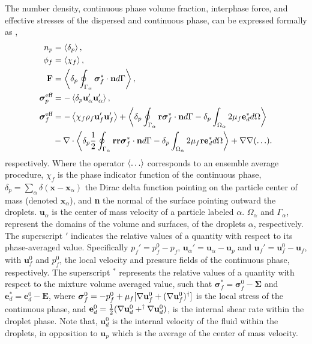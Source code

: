 The number density, continuous phase volume fraction, interphase force, and effective stresses of the dispersed and continuous phase, can be expressed formally as \citep{fintzi2025averaged},
\begin{align}
    n_p &= \pavg{}
    \label{eq:n_p},\\
    \phi_f &= \avg{\chi_f}
    \label{eq:chi_f},\\
    \textbf{F}  &= \pSavg{\bm\sigma^*_f\cdot \textbf{n}}
    \label{eq:f_alpha}
    ,\\
    \bm{\sigma}_p^{\text{eff}} &= -\pavg{\textbf{u}_\alpha'\textbf{u}_\alpha'}
    \label{eq:def_uup}
    ,\\
    \bm{\sigma}^{\text{eff}}_f 
    &= 
    - \avg{\chi_f\rho_f \textbf{u}_f'\textbf{u}_f'} 
    + \pavg{\intS{\textbf{r}\bm\sigma^{*}_f\cdot \textbf{n}} - \delta_p\intO{2\mu_f\textbf{e}_d^*}}\nonumber\\
    &- \div
        \pavg{ \frac{1}{2}\intS{\textbf{rr}\bm\sigma^{*}_f\cdot \textbf{n}}
        - \delta_p\intO{2\mu_f \textbf{r} \textbf{e}_d^*}}
        + \grad\grad (\ldots). 
    \label{eq:def_sigma_eff_f}
\end{align}
respectively. 
Where the operator $\left<\ldots\right>$ corresponds to an ensemble average procedure,  $\chi_f$ is the phase indicator function of the continuous phase, $\delta_p = \sum_\alpha \delta(\textbf{x}-\textbf{x}_\alpha)$ the Dirac delta function pointing on the particle center of mass (denoted $\textbf{x}_\alpha$), and \textbf{n} the normal of the surface pointing outward the droplets. 
$\textbf{u}_\alpha$ is the center of mass velocity of a particle labeled $\alpha$. $\Omega_\alpha$ and $\Gamma_\alpha$, represent the domains of the volume and surfaces, of the droplets $\alpha$, respectively. 
The superscript $'$ indicates the relative values of a quantity with respect to its phase-averaged value. 
Specifically $p_f' = p_f^0 - p_f$, $\textbf{u}_\alpha' = \textbf{u}_\alpha - \textbf{u}_p$ and $\textbf{u}_f' = \textbf{u}_f^0  -\textbf{u}_f$, with $\textbf{u}_f^0$ and $p_f^0$,  the local velocity and pressure fields of the continuous phase, respectively. 
The superscript $^*$ represents the relative values of a quantity with respect to the mixture volume averaged value, such that $\bm{\sigma}_f^* = \bm{\sigma}_f^0  - \bm{\Sigma}$ and $\textbf{e}_d^* = \textbf{e}_d^0 - \textbf{E}$, where $\bm{\sigma}_f^0 = -p_f^0 + \mu_f [\mathbf{\nabla} \textbf{u}_f^0 + (\mathbf{\nabla} \textbf{u}_f^0)^\dagger]$ is the local stress of the continuous phase, and $\textbf{e}_d^0 =\frac{1}{2}(\mathbf{\nabla} \textbf{u}_d^0+^\dagger\mathbf{\nabla} \textbf{u}_d^0)$, is the internal shear rate within the droplet phase.
Note that, $\textbf{u}_d^0$ is the internal velocity of the fluid within the droplets, in opposition to $\textbf{u}_p$ which is the average of the center of mass velocity. 




